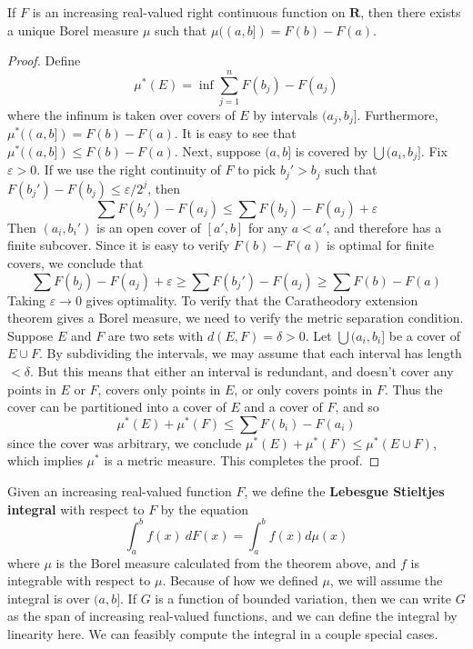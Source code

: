 \begin{theorem}
    If $F$ is an increasing real-valued right continuous function on $\mathbf{R}$, then there exists a unique Borel measure $\mu$ such that $\mu((a,b]) = F(b) - F(a)$.
\end{theorem}
\begin{proof}
    Define
    \[ \mu^*(E) = \inf \sum_{j = 1}^n F(b_j) - F(a_j) \]
    where the infinum is taken over covers of $E$ by intervals $(a_j,b_j]$. Furthermore, $\mu^*((a,b]) = F(b) - F(a)$. It is easy to see that $\mu^*((a,b]) \leq F(b) - F(a)$. Next, suppose $(a,b]$ is covered by $\bigcup (a_i,b_j]$. Fix $\varepsilon > 0$. If we use the right continuity of $F$ to pick $b_j' > b_j$ such that $F(b_j') - F(b_j) \leq \varepsilon/2^j$, then
    \[ \sum F(b_j') - F(a_j) \leq \sum F(b_j) - F(a_j) + \varepsilon \]
    Then $(a_i,b_i')$ is an open cover of $[a',b]$ for any $a < a'$, and therefore has a finite subcover. Since it is easy to verify $F(b) - F(a)$ is optimal for finite covers, we conclude that
    \[ \sum F(b_j) - F(a_j) + \varepsilon \geq \sum F(b_j') - F(a_j) \geq \sum F(b) - F(a) \]
    Taking $\varepsilon \to 0$ gives optimality. To verify that the Caratheodory extension theorem gives a Borel measure, we need to verify the metric separation condition. Suppose $E$ and $F$ are two sets with $d(E,F) = \delta > 0$. Let $\bigcup (a_i,b_i]$ be a cover of $E \cup F$. By subdividing the intervals, we may assume that each interval has length $< \delta$. But this means that either an interval is redundant, and doesn't cover any points in $E$ or $F$, covers only points in $E$, or only covers points in $F$. Thus the cover can be partitioned into a cover of $E$ and a cover of $F$, and so
    \[ \mu^*(E) + \mu^*(F) \leq \sum F(b_i) - F(a_i) \]
    since the cover was arbitrary, we conclude $\mu^*(E) + \mu^*(F) \leq \mu^*(E \cup F)$, which implies $\mu^*$ is a metric measure. This completes the proof.
\end{proof}

Given an increasing real-valued function $F$, we define the {\bf Lebesgue Stieltjes integral} with respect to $F$ by the equation
%
\[ \int_a^b f(x)\ dF(x) = \int_a^b f(x) d\mu(x) \]
%
where $\mu$ is the Borel measure calculated from the theorem above, and $f$ is integrable with respect to $\mu$. Because of how we defined $\mu$, we will assume the integral is over $(a,b]$. If $G$ is a function of bounded variation, then we can write $G$ as the span of increasing real-valued functions, and we can define the integral by linearity here. We can feasibly compute the integral in a couple special cases.

